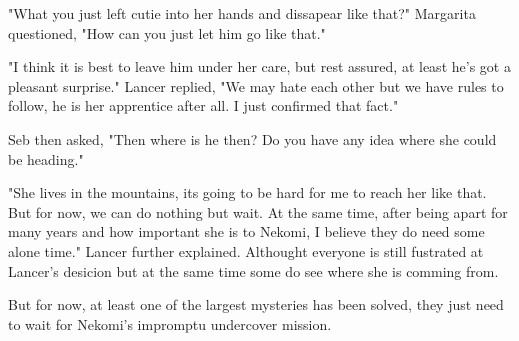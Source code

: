 "What you just left cutie into her hands and dissapear like that?" Margarita questioned, "How can you just let him go like that."

"I think it is best to leave him under her care, but rest assured, at least he's got a pleasant surprise." Lancer replied, "We may hate each other but we have rules to follow, he is her apprentice after all. I just confirmed that fact."

Seb then asked, "Then where is he then? Do you have any idea where she could be heading."

"She lives in the mountains, its going to be hard for me to reach her like that. But for now, we can do nothing but wait. At the same time, after being apart for many years and how important she is to Nekomi, I believe they do need some alone time." Lancer further explained. Althought everyone is still fustrated at Lancer's desicion but at the same time some do see where she is comming from.

But for now, at least one of the largest mysteries has been solved, they just need to wait for Nekomi's impromptu undercover mission.